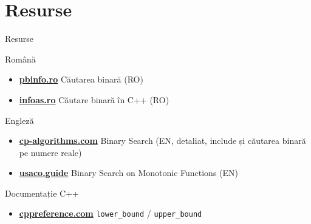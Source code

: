 ﻿\documentclass{beamer}
\begin{document}
\section{Resurse}

\begin{frame}{Resurse}
  \begin{block}{Română}
    \begin{itemize}\footnotesize\itemsep0pt
      \item \href{https://www.pbinfo.ro/articole/3633/cautarea-binara}{\textbf{pbinfo.ro}} \textemdash{} Căutarea binară (RO)
      \item \href{https://infoas.ro/lectie/122/cautare-binara-in-c}{\textbf{infoas.ro}} \textemdash{} Căutare binară în C++ (RO)
    \end{itemize}
  \end{block}
  \vspace{-6pt}
  \begin{block}{Engleză}
    \begin{itemize}\footnotesize\itemsep0pt
      \item \href{https://cp-algorithms.com/num_methods/binary_search.html}{\textbf{cp-algorithms.com}} \textemdash{} Binary Search (EN, detaliat, include și căutarea binară pe numere reale)
      \item \href{https://usaco.guide/silver/binary-search}{\textbf{usaco.guide}} \textemdash{} Binary Search on Monotonic Functions (EN)
    \end{itemize}
  \end{block}
  \vspace{-6pt}
  \begin{block}{Documentație C++}
    \begin{itemize}\footnotesize\itemsep0pt
      \item \href{https://en.cppreference.com/w/cpp/algorithm/lower_bound.html}{\textbf{cppreference.com}} \textemdash{} \texttt{lower\_bound} / \texttt{upper\_bound}

\end{itemize}
\end{block}
\end{frame}
\end{document}
